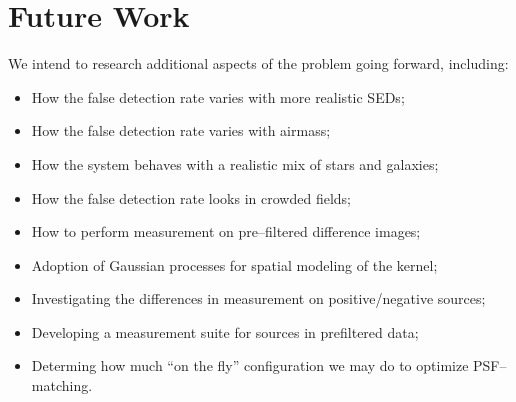 \documentclass[prd, nofootinbib, floatfix, 11pt,tightenlines,times]{article}
\begin{document}
\section{Future Work}

We intend to research additional aspects of the problem going forward,
including:
\begin{itemize}
\item How the false detection rate varies with more realistic SEDs;
\item How the false detection rate varies with airmass;
\item How the system behaves with a realistic mix of stars and galaxies;
\item How the false detection rate looks in crowded fields;
\item How to perform measurement on pre--filtered difference images;
\item Adoption of Gaussian processes for spatial modeling of the kernel;
\item Investigating the differences in measurement on positive/negative sources;
\item Developing a measurement suite for sources in prefiltered data;
\item Determing how much ``on the fly'' configuration we may do to optimize PSF--matching.
\end{itemize}

\clearpage


\end{document}
